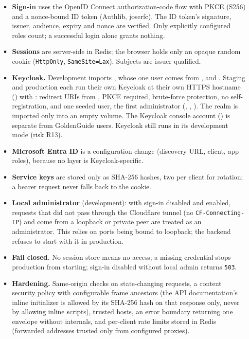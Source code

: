 \documentclass[11pt,letterpaper]{report}
\begin{document}
\begin{itemize}
  \item \textbf{Sign-in} uses the OpenID Connect authorization-code flow with PKCE (S256) and a nonce-bound
        ID token (Authlib, joserfc). The ID token's signature, issuer, audience, expiry and nonce are
        verified. Only explicitly configured roles count; a successful login alone grants nothing.
  \item \textbf{Sessions} are server-side in Redis; the browser holds only an opaque random cookie
        (\texttt{HttpOnly}, \texttt{SameSite=Lax}). Subjects are issuer-qualified.
  \item \textbf{Keycloak.} Development imports , whose one user comes from
        ,  and . Staging and
        production each run their own Keycloak at their own HTTPS hostname () with
        : redirect URIs from , PKCE required,
        brute-force protection, no self-registration, and one seeded user, the first administrator
        (, , ). The realm is imported
        only into an empty volume. The Keycloak console account () is
        separate from GoldenGuide users. Keycloak still runs in its development mode (risk R13).
  \item \textbf{Microsoft Entra ID} is a configuration change (discovery URL, client, app roles), because
        no layer is Keycloak-specific.
  \item \textbf{Service keys} are stored only as SHA-256 hashes, two per client for rotation; a bearer
        request never falls back to the cookie.
  \item \textbf{Local administrator} (development): with sign-in disabled and  enabled,
        requests that did not pass through the Cloudflare tunnel (no \texttt{CF-Connecting-IP}) and come
        from a loopback or private peer are treated as an administrator. This relies on ports being bound
        to loopback; the backend refuses to start with it in production.
  \item \textbf{Fail closed.} No session store means no access; a missing credential stops production
        from starting; sign-in disabled without local admin returns \texttt{503}.
  \item \textbf{Hardening.} Same-origin checks on state-changing requests, a content security policy with
        configurable frame ancestors (the API documentation's inline initializer is allowed by its SHA-256 hash on
        that response only, never by allowing inline scripts), trusted hosts, an error boundary returning one envelope without
        internals, and per-client rate limits stored in Redis (forwarded addresses trusted only from
        configured proxies).
\end{itemize}
\end{document}

